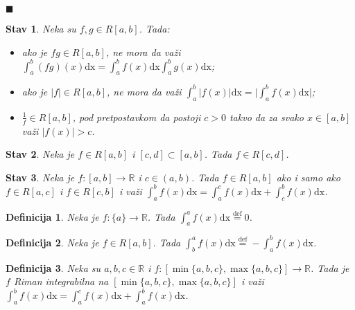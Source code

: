 \documentclass{article}
\newtheorem{definicija}{Definicija}[section]
\newtheorem{stav}{Stav}[section]
\begin{document}
\null\hfill $\blacksquare$\par
\begin{stavbox}
    \begin{stav}
        Neka su $f, g \in R[a, b]$. Tada:
        \begin{itemize}
            \item ako je $fg \in R[a, b]$, ne mora da važi $\displaystyle \int^b_a (fg)(x)\text{dx} = \int^b_af(x)\text{dx}  \int^b_ag(x)\text{dx}$;
            \item ako je $|f|\in R[a, b]$, ne mora da važi $\displaystyle \int^b_a \big|f(x)\big|\text{dx} = \bigg|\int^b_a f(x)\text{dx}\bigg| $;
            \item $\frac{1}{f} \in R[a, b]$, pod pretpostavkom da postoji $c > 0$ takvo da za svako $x \in [a, b]$ važi $|f(x)| > c$.
        \end{itemize}
    \end{stav}
\end{stavbox}
\begin{stavbox}
    \begin{stav}
        Neka je $f\in R[a, b]$ i $[c, d] \subset [a, b]$. Tada $f\in R[c,d]$.
    \end{stav}
\end{stavbox}
\begin{stavbox}
    \begin{stav}
        Neka je $f:[a,b] \longrightarrow \mathbb{R}$ i $c \in (a, b)$. Tada $f\in R[a,b]$ ako i samo ako $f \in R[a, c]$ i $f\in R[c, b]$ i važi
        $\displaystyle\int^b_a f(x)\text{dx} = \int^c_a f(x)\text{dx} + \int^b_c f(x)\text{dx}$.
    \end{stav}
\end{stavbox}
\begin{defbox}
    \begin{definicija}
        Neka je $f:\{a\} \longrightarrow \mathbb{R}$. Tada
        $\displaystyle\int^a_a f(x)\text{dx} \overset{\text{def}}{=} 0$.
    \end{definicija}
\end{defbox}
\begin{defbox}
    \begin{definicija}
        Neka je $f \in R[a, b]$. Tada $\displaystyle\int^a_b f(x)\text{dx} \overset{\text{def}}{=} -\int^b_a f(x)\text{dx}$.
    \end{definicija}
\end{defbox}
\begin{defbox}
    \begin{definicija} Neka su $a, b, c \in \mathbb{R}$ i $f:[\min\{a, b, c\}, \max\{a, b, c\}] \longrightarrow \mathbb{R}$. Tada je
        $f$ Riman integrabilna na $[\min\{a, b, c\}, \max\{a, b, c\}]$ i važi
        $\displaystyle \int^b_a f(x)\text{dx} = \int^c_a f(x)\text{dx} + \int^b_a f(x) \text{dx}$.
    \end{definicija}
\end{defbox}
\end{document}
